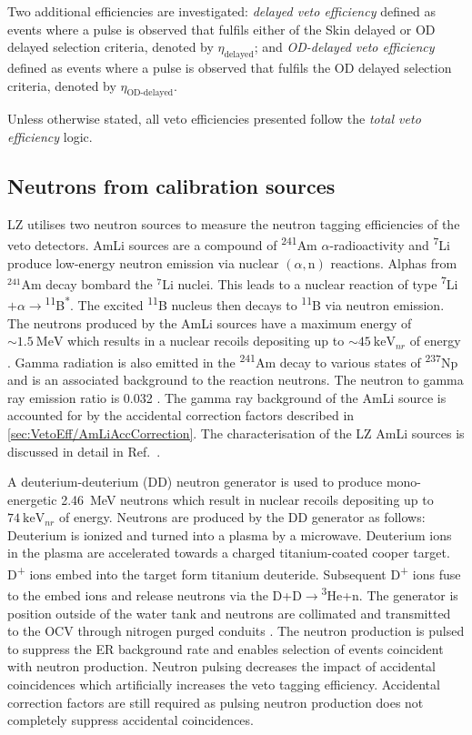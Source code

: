 Two additional efficiencies are investigated: \textit{delayed veto efficiency} defined as events where a pulse is observed that fulfils either of the Skin delayed or OD delayed selection criteria, denoted by $\eta_\text{delayed}$; and \textit{OD-delayed veto efficiency} defined as events where a pulse is observed that fulfils the OD delayed selection criteria, denoted by $\eta_\text{OD-delayed}$.

Unless otherwise stated, all veto efficiencies presented follow the \textit{total veto efficiency} logic.

\subsection{Neutrons from calibration sources}\label{sec:VetoEff/NeutronsFromCalibrationSources}
LZ utilises two neutron sources to measure the neutron tagging efficiencies of the veto detectors. AmLi sources are a compound of \textsuperscript{241}Am $\alpha$-radioactivity and \textsuperscript{7}Li produce low-energy neutron emission via nuclear $(\alpha,\text{n})$ reactions. Alphas from $^{241}$Am decay bombard the $^{7}$Li nuclei. This leads to a nuclear reaction of type \textsuperscript{7}Li$+\alpha \rightarrow$\textsuperscript{11}B\textsuperscript{*}. The excited \textsuperscript{11}B nucleus then decays to \textsuperscript{11}B via neutron emission. The neutrons produced by the AmLi sources have a maximum energy of $\sim1.5~\text{MeV}$ which results in a nuclear recoils depositing up to $\sim45~\text{keV}_{nr}$ of energy \cite{LZ:2024bsz}. Gamma radiation is also emitted in the \textsuperscript{241}Am decay to various states of \textsuperscript{237}Np and is an associated background to the reaction neutrons. The neutron to gamma ray emission ratio is 0.032 \cite{Sazzad:2023uqs}. The gamma ray background of the AmLi source is accounted for by the accidental correction factors described in \autoref{sec:VetoEff/AmLiAccCorrection}. The characterisation of the LZ AmLi sources is discussed in detail in Ref.~\cite{Sazzad:2023uqs}.

A deuterium-deuterium (DD) neutron generator is used to produce mono-energetic 2.46~MeV neutrons which result in nuclear recoils depositing up to $74~\text{keV}_{nr}$ of energy. Neutrons are produced by the DD generator as follows: Deuterium is ionized and turned into a plasma by a microwave. Deuterium ions in the plasma are accelerated towards a charged titanium-coated cooper target. D\textsuperscript{+} ions embed into the target form titanium deuteride. Subsequent D\textsuperscript{+} ions fuse to the embed ions and release neutrons via the D+D$\rightarrow$\textsuperscript{3}He+n. The generator is position outside of the water tank and neutrons are collimated and transmitted to the OCV through nitrogen purged conduits \cite{LZ:2024bsz}. The neutron production is pulsed to suppress the ER background rate and enables selection of events coincident with neutron production. Neutron pulsing decreases the impact of accidental coincidences which artificially increases the veto tagging efficiency. Accidental correction factors are still required as pulsing neutron production does not completely suppress accidental coincidences.

